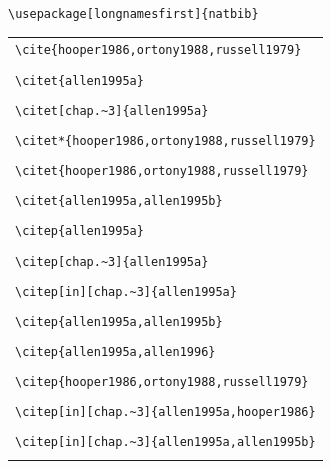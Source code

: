 ﻿\documentclass{article}
\begin{document}
\verb#\usepackage[longnamesfirst]{natbib}#\\

\begin{center}
\begin{tabular}{l}
\verb#\cite{hooper1986,ortony1988,russell1979}# \\
\cite{hooper1986,ortony1988,russell1979}  \\\hline \hline
%
\verb#\citet{allen1995a}# \\
 \citet{allen1995a} \\\hline
\verb#\citet[chap.~3]{allen1995a}# \\
 \citet[chap.~3]{allen1995a} \\\hline
\verb#\citet*{hooper1986,ortony1988,russell1979}# \\
 \citet*{hooper1986,ortony1988,russell1979}  \\\hline
\verb#\citet{hooper1986,ortony1988,russell1979}# \\
 \citet{hooper1986,ortony1988,russell1979}  \\\hline
\verb#\citet{allen1995a,allen1995b}# \\
 \citet{allen1995a,allen1995b} \\\hline\hline
%
\verb#\citep{allen1995a}# \\
 \citep{allen1995a} \\\hline
\verb#\citep[chap.~3]{allen1995a}# \\
 \citep[chap.~3]{allen1995a} \\\hline
\verb#\citep[in][chap.~3]{allen1995a}# \\
 \citep[in][chap.~3]{allen1995a} \\\hline
\verb#\citep{allen1995a,allen1995b}# \\
 \citep{allen1995a,allen1995b} \\\hline
\verb#\citep{allen1995a,allen1996}# \\
 \citep{allen1995a,allen1996} \\\hline
\verb#\citep{hooper1986,ortony1988,russell1979}# \\
 \citep{hooper1986,ortony1988,russell1979}  \\\hline
\verb#\citep[in][chap.~3]{allen1995a,hooper1986}# \\
 \citep[in][chap.~3]{allen1995a,hooper1986} \\\hline
[Fails in 1.9.15] \verb#\citep[in][chap.~3]{allen1995a,allen1995b}# \\
 \citep[in][chap.~3]{allen1995a,allen1995b} \\\hline

\end{tabular}
\end{center}
\end{document}

